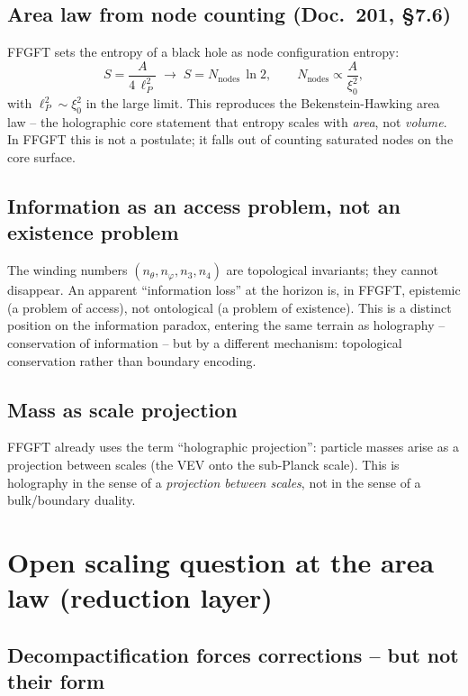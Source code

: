 \subsection*{Area law from node counting (Doc.~201, §7.6)}

FFGFT sets the entropy of a black hole as node configuration entropy:
\[
S = \frac{A}{4\,\ell_P^2} \;\longrightarrow\; S = N_{\text{nodes}}\,\ln 2,
\qquad N_{\text{nodes}} \propto \frac{A}{\xi_0^2},
\]
with $\ell_P^2 \sim \xi_0^2$ in the large limit. This reproduces the
Bekenstein-Hawking area law -- the holographic core statement that entropy
scales with \emph{area}, not \emph{volume}. In FFGFT this is not a postulate;
it falls out of counting saturated nodes on the core surface.

\subsection*{Information as an access problem, not an existence problem}

The winding numbers $(n_\theta, n_\varphi, n_3, n_4)$ are topological
invariants; they cannot disappear. An apparent \enquote{information loss} at
the horizon is, in FFGFT, epistemic (a problem of access), not ontological (a
problem of existence). This is a distinct position on the information
paradox, entering the same terrain as holography -- conservation of
information -- but by a different mechanism: topological conservation rather
than boundary encoding.

\subsection*{Mass as scale projection}

FFGFT already uses the term \enquote{holographic projection}: particle masses
arise as a projection between scales (the VEV onto the sub-Planck scale). This
is holography in the sense of a \emph{projection between scales}, not in the
sense of a bulk/boundary duality.

\section{Open scaling question at the area law (reduction layer)}
\label{sec:263-open}

\subsection*{Decompactification forces corrections -- but not their form}

